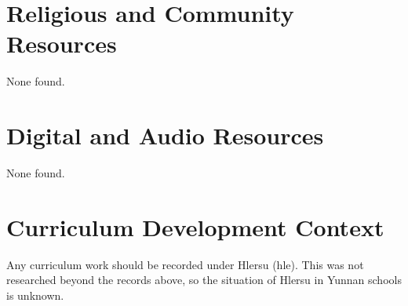 \documentclass[12pt]{article}
\begin{document}
\section{Religious and Community Resources}
None found.

\section{Digital and Audio Resources}
None found.

\section{Curriculum Development Context}
Any curriculum work should be recorded under Hlersu (hle). This was not researched beyond the records above, so the situation of Hlersu in Yunnan schools is unknown.
\end{document}
